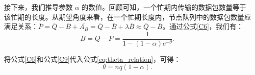 接下来，我们推导参数 $\alpha$ 的数值。回顾可知，一个忙期内传输的数据包数量等于该忙期的长度。从期望角度来看，在一个忙期长度内，节点队列中的数据包数量应满足关系：$\overline{P} = \overline{Q} - \overline{B} + \overline{A_B} = \overline{Q} - \overline{B} + \lambda \overline{B} \approx \overline{Q} - \overline{B}$。通过公式\eqref{C6}，我们有：
\begin{equation}\label{C9}
\overline{B} = \overline{Q} - \overline{P} = \frac{1}{1 - (1-\alpha) e^{-\theta}}.
\end{equation}

将公式\eqref{C6}和公式\eqref{C9}代入公式\eqref{eq:theta_relation}，可得：
\begin{equation}\label{A14}
\theta = n q (1-\alpha).
\end{equation}
